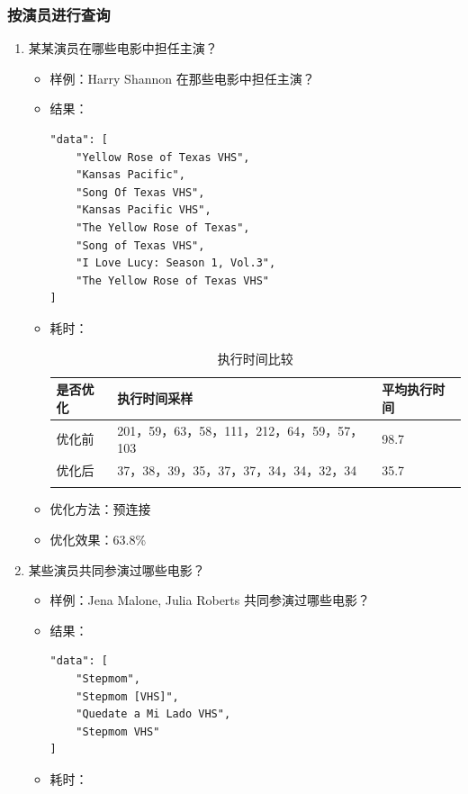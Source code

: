 \documentclass{ctexrep}
\begin{document}
	\subsubsection{按演员进行查询}
	    \begin{enumerate}
	        \item 某某演员在哪些电影中担任主演？
    	        \begin{itemize}
    	            \item 样例：Harry Shannon 在那些电影中担任主演？
    	            \item 结果：
    	                \begin{lstlisting}
"data": [
    "Yellow Rose of Texas VHS",
    "Kansas Pacific",
    "Song Of Texas VHS",
    "Kansas Pacific VHS",
    "The Yellow Rose of Texas",
    "Song of Texas VHS",
    "I Love Lucy: Season 1, Vol.3",
    "The Yellow Rose of Texas VHS"
]
    	                \end{lstlisting}
    	            \item 耗时：
    	                \begin{longtable}{l|p{5cm}|l}
    	                    \hline
    	                    是否优化 & 执行时间采样 & 平均执行时间\\
    	                    \hline
    	                    \hline
    	                    优化前 & 201，59，63，58，111，212，64，59，57，103 & 98.7\\
    	                    优化后 & 37，38，39，35，37，37，34，34，32，34 & 35.7\\
    	                    \hline
    	                    \caption{执行时间比较}
    	                \end{longtable}
    	            \item 优化方法：预连接
    	            \item 优化效果：63.8\%
    	        \end{itemize}
	        \item 某些演员共同参演过哪些电影？
    	        \begin{itemize}
    	            \item 样例：Jena Malone, Julia Roberts 共同参演过哪些电影？
    	            \item 结果：
    	                \begin{lstlisting}
"data": [
    "Stepmom",
    "Stepmom [VHS]",
    "Quedate a Mi Lado VHS",
    "Stepmom VHS"
]
    	                \end{lstlisting}
    	            \item 耗时：

\end{itemize}
\end{enumerate}
\end{document}
